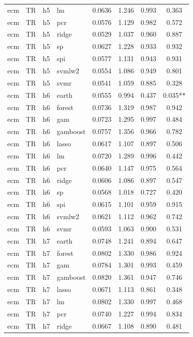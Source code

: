 \begin{ThreePartTable}
\begin{longtable}[t]{llclcccc}
ecm & TR & h5 & lm & 0.0636 & 1.246 & 0.993 & 0.363\\
ecm & TR & h5 & pcr & 0.0576 & 1.129 & 0.982 & 0.572\\
ecm & TR & h5 & ridge & 0.0529 & 1.037 & 0.960 & 0.887\\
ecm & TR & h5 & sp & 0.0627 & 1.228 & 0.933 & 0.932\\
ecm & TR & h5 & spi & 0.0577 & 1.131 & 0.943 & 0.931\\
ecm & TR & h5 & svmlw2 & 0.0554 & 1.086 & 0.949 & 0.801\\
ecm & TR & h5 & svmr & 0.0541 & 1.059 & 0.885 & 0.328\\
\addlinespace
ecm & TR & h6 & earth & 0.0555 & 0.994 & 0.437 & 0.035**\\
ecm & TR & h6 & forest & 0.0736 & 1.319 & 0.987 & 0.942\\
ecm & TR & h6 & gam & 0.0723 & 1.295 & 0.997 & 0.484\\
ecm & TR & h6 & gamboost & 0.0757 & 1.356 & 0.966 & 0.782\\
ecm & TR & h6 & lasso & 0.0617 & 1.107 & 0.897 & 0.506\\
ecm & TR & h6 & lm & 0.0720 & 1.289 & 0.996 & 0.442\\
ecm & TR & h6 & pcr & 0.0640 & 1.147 & 0.975 & 0.564\\
ecm & TR & h6 & ridge & 0.0606 & 1.086 & 0.897 & 0.547\\
ecm & TR & h6 & sp & 0.0568 & 1.018 & 0.727 & 0.420\\
ecm & TR & h6 & spi & 0.0615 & 1.101 & 0.959 & 0.915\\
ecm & TR & h6 & svmlw2 & 0.0621 & 1.112 & 0.962 & 0.742\\
ecm & TR & h6 & svmr & 0.0593 & 1.063 & 0.900 & 0.531\\
\addlinespace
ecm & TR & h7 & earth & 0.0748 & 1.241 & 0.894 & 0.647\\
ecm & TR & h7 & forest & 0.0802 & 1.330 & 0.986 & 0.924\\
ecm & TR & h7 & gam & 0.0784 & 1.301 & 0.993 & 0.459\\
ecm & TR & h7 & gamboost & 0.0820 & 1.361 & 0.947 & 0.746\\
ecm & TR & h7 & lasso & 0.0671 & 1.113 & 0.861 & 0.348\\
ecm & TR & h7 & lm & 0.0802 & 1.330 & 0.997 & 0.468\\
ecm & TR & h7 & pcr & 0.0740 & 1.227 & 0.994 & 0.834\\
ecm & TR & h7 & ridge & 0.0667 & 1.108 & 0.890 & 0.481\\

\end{longtable}
\end{ThreePartTable}
